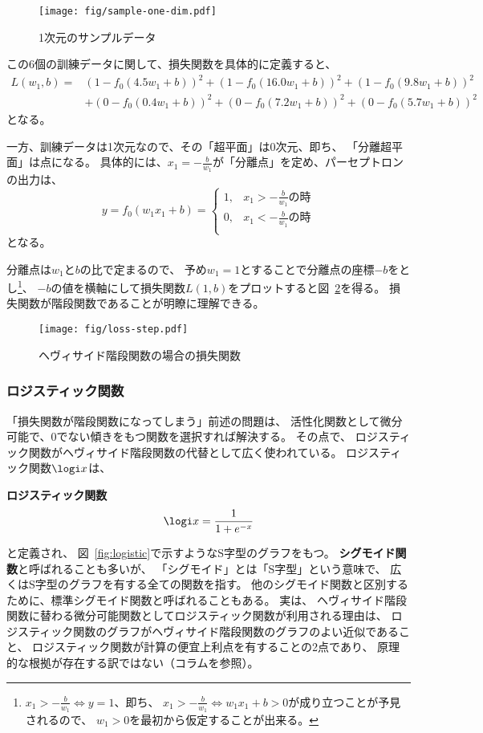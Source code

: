 \begin{figure}
  \centering
  \texttt{[image: fig/sample-one-dim.pdf]}
  \caption{1次元のサンプルデータ}
  \label{fig:sample-one-dim}
\end{figure}

この6個の訓練データに関して、損失関数を具体的に定義すると、
\begin{align*}
  L(w_1, b) =
  &
    \left(1 - f_0(4.5 w_1 + b)\right)^2 + \left(1 - f_0(16.0 w_1 + b)\right)^2 + \left(1 - f_0(9.8 w_1 + b)\right)^2
  \\&
  + \left(0 - f_0(0.4 w_1 + b)\right)^2 + \left(0 - f_0(7.2 w_1 + b)\right)^2 + \left(0 - f_0(5.7 w_1 + b)\right)^2
\end{align*}
となる。

一方、訓練データは1次元なので、その「超平面」は0次元、即ち、
「分離超平面」は点になる。
具体的には、$x_1 = -\frac b{w_1}$が「分離点」を定め、パーセプトロンの出力は、
\[
  y = f_0(w_1 x_1 + b) =
  \begin{cases}
    1, & \text{$x_1 > -\frac b{w_1}$の時}\\
    0, & \text{$x_1 < -\frac b{w_1}$の時}\\
  \end{cases}
\]
となる。

分離点は$w_1$と$b$の比で定まるので、
予め$w_1 = 1$とすることで分離点の座標$-b$をとし\footnote{
  $x_1 > -\frac b{w_1}　\Leftrightarrow y = 1$、即ち、
  $x_1 > -\frac b{w_1} \Leftrightarrow w_1x_1 + b > 0$が成り立つことが予見されるので、
  $w_1 > 0$を最初から仮定することが出来る。}、
$-b$の値を横軸にして損失関数$L(1, b)$をプロットすると図~\ref{fig:loss-step}を得る。
損失関数が階段関数であることが明瞭に理解できる。

\begin{figure}
  \centering
  \texttt{[image: fig/loss-step.pdf]}
  \caption{ヘヴィサイド階段関数の場合の損失関数}
  \label{fig:loss-step}
\end{figure}

\subsubsection{ロジスティック関数}
\label{sec:logistic-function}

「損失関数が階段関数になってしまう」前述の問題は、
活性化関数として微分可能で、0でない傾きをもつ関数を選択すれば解決する。
その点で、
ロジスティック関数がヘヴィサイド階段関数の代替として広く使われている。
ロジスティック関数$\logi x$は、
\begin{itembox}{\bf ロジスティック関数}
\[
  \logi x = \frac 1{1 + e^{-x}}
\]
\end{itembox}
と定義され、
図~\ref{fig:logistic}で示すようなS字型のグラフをもつ。
\textbf{シグモイド関数}と呼ばれることも多いが、
「シグモイド」とは「S字型」という意味で、
広くはS字型のグラフを有する全ての関数を指す。
他のシグモイド関数と区別するために、標準シグモイド関数と呼ばれることもある。
実は、
ヘヴィサイド階段関数に替わる微分可能関数としてロジスティック関数が利用される理由は、
ロジスティック関数のグラフがヘヴィサイド階段関数のグラフのよい近似であること、
ロジスティック関数が計算の便宜上利点を有することの2点であり、
原理的な根拠が存在する訳ではない（コラムを参照）。

